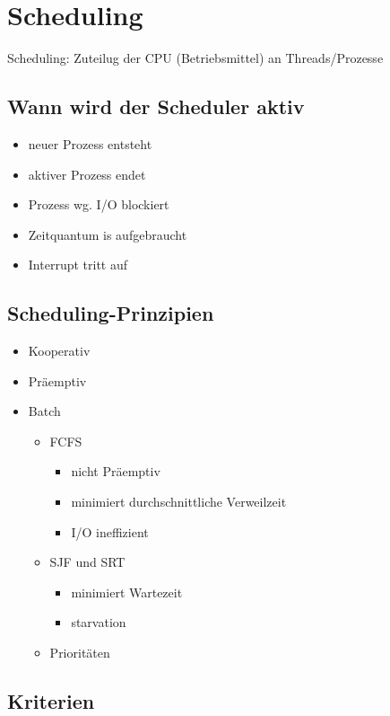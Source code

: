 \section{Scheduling}

Scheduling: Zuteilug der CPU (Betriebsmittel) an Threads/Prozesse

\subsection{Wann wird der Scheduler aktiv}
\begin{itemize}
    \item neuer Prozess entsteht
    \item aktiver Prozess endet
    \item Prozess wg. I/O blockiert
    \item Zeitquantum is aufgebraucht
    \item Interrupt tritt auf
\end{itemize}

\subsection{Scheduling-Prinzipien}
\begin{itemize}
    \item Kooperativ
    \item Präemptiv
    \item Batch
    \begin{itemize}
        \item FCFS
        \begin{itemize}
            \item nicht Präemptiv
            \item minimiert durchschnittliche Verweilzeit
            \item I/O ineffizient
        \end{itemize}
        \item SJF und SRT
        \begin{itemize}
            \item minimiert Wartezeit
            \item starvation
        \end{itemize}
        \item Prioritäten
    \end{itemize}
\end{itemize}

\subsection{Kriterien}

